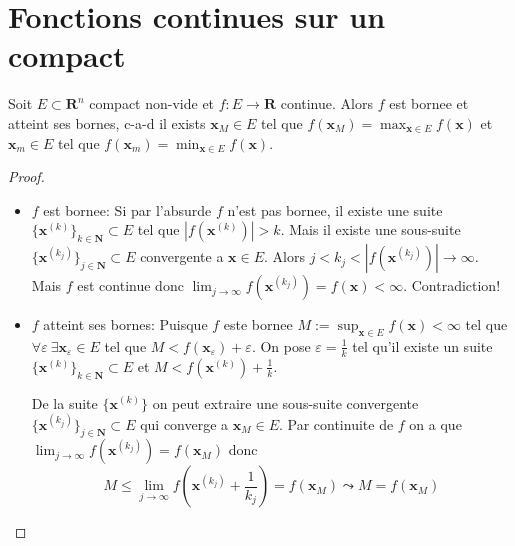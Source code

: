 \section{Fonctions continues sur un compact}

\begin{theorem}
Soit  $E\subset \mathbf{R}^{n}$ compact non-vide et $f:E\to \mathbf{R}$ continue. Alors $f$ est bornee et atteint ses bornes, c-a-d il exists $\boldsymbol{x}_{M}\in E$ tel que $f(\boldsymbol{x}_{M})=\max_{\boldsymbol{x}\in E}f(\boldsymbol{x})$ et $\boldsymbol{x}_{m}\in E$ tel que $f(\boldsymbol{x}_{m})=\min_{\boldsymbol{x}\in E}f(\boldsymbol{x})$.
\end{theorem}
\begin{proof}
\begin{itemize}
\item $f$ est bornee: Si par l'absurde $f$ n'est pas bornee, il existe une suite $\{ \boldsymbol{x}^{(k)} \}_{k\in \mathbf{N}}\subset E$ tel que $|f(\boldsymbol{x}^{(k)})|>k$. Mais il existe une sous-suite $\{ \boldsymbol{x}^{(k_{j})} \}_{j\in \mathbf{N}}\subset E$ convergente a $\boldsymbol{x}\in E$. Alors $j<k_{j}<|f(\boldsymbol{x}^{(k_{j})})|\to \infty$. Mais $f$ est continue donc $\lim_{ j \to \infty }f(\boldsymbol{x}^{(k_{j})})=f(\boldsymbol{x})<\infty$. Contradiction!
\item $f$ atteint ses bornes: Puisque $f$ este bornee $M:=\sup_{\boldsymbol{x}\in E}f(\boldsymbol{x})<\infty$ tel que $\forall\varepsilon~\exists \boldsymbol{x}_{\varepsilon}\in E$ tel que $M<f(\boldsymbol{x}_{\varepsilon})+\varepsilon$. On pose $\varepsilon=\frac{1}{k}$ tel qu'il existe un suite $\{ \boldsymbol{x}^{(k)} \}_{k\in \mathbf{N}}\subset E$ et $M<f(\boldsymbol{x}^{(k)})+ \frac{1}{k}$.

De la suite $\{ \boldsymbol{x}^{(k)} \}$ on peut extraire une sous-suite convergente $\{ \boldsymbol{x}^{(k_{j})} \}_{j\in \mathbf{N}}\subset E$ qui converge a $\boldsymbol{x}_{M}\in E$. Par continuite de $f$ on a que $\lim_{ j \to \infty } f(\boldsymbol{x}^{(k_{j})})=f(\boldsymbol{x}_{M})$ donc 
$$
M\le \lim_{ j \to \infty } f\left( \boldsymbol{x}^{(k_{j})}+\frac{1}{k_{j}} \right)=f(\boldsymbol{x}_{M}) \leadsto M=f(\boldsymbol{x}_{M})
$$
\end{itemize}
\end{proof}

